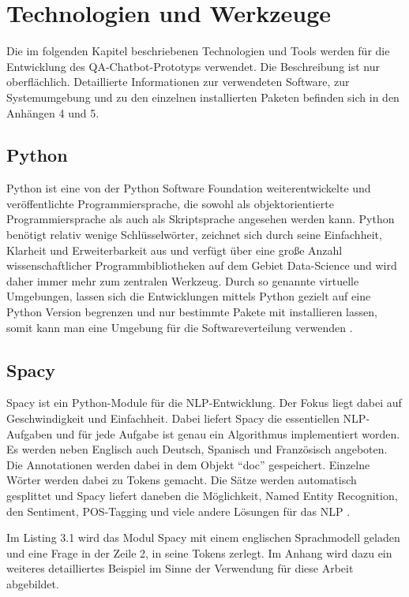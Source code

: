\documentclass[
        ngerman,
        paper=a4,
        numbers=noendperiod,
]{scrreprt}
\begin{document}
\chapter{Technologien und Werkzeuge}

Die im folgenden Kapitel beschriebenen Technologien und Tools werden für die Entwicklung des QA-Chatbot-Prototyps verwendet. Die Beschreibung ist nur oberflächlich. Detaillierte Informationen zur verwendeten Software, zur Systemumgebung und zu den einzelnen installierten Paketen befinden sich in den Anhängen 4 und 5. %
\section{Python}
Python ist eine von der Python Software Foundation weiterentwickelte und veröffentlichte Programmiersprache, die sowohl als objektorientierte Programmiersprache als auch als Skriptsprache angesehen werden kann. Python benötigt relativ wenige Schlüsselwörter, zeichnet sich durch seine Einfachheit, Klarheit und Erweiterbarkeit aus und verfügt über eine große Anzahl wissenschaftlicher Programmbibliotheken auf dem Gebiet Data-Science und wird daher immer mehr zum zentralen Werkzeug. 
Durch so genannte virtuelle Umgebungen, lassen sich die Entwicklungen mittels Python gezielt auf eine Python Version begrenzen und nur bestimmte Pakete mit installieren lassen, somit kann man eine Umgebung für die Softwareverteilung verwenden \citep[S. 2]{GrotzGrundkurs0.1.2d}.
\section{Spacy}
Spacy ist ein Python-Module für die NLP-Entwicklung. Der Fokus liegt dabei auf Geschwindigkeit und Einfachheit. Dabei liefert Spacy die essentiellen NLP-Aufgaben und für jede Aufgabe ist genau ein Algorithmus implementiert worden. Es werden neben Englisch auch Deutsch, Spanisch und Französisch angeboten. Die Annotationen werden dabei in dem Objekt \enquote{doc} gespeichert. Einzelne Wörter werden dabei zu Tokens gemacht. Die Sätze werden automatisch gesplittet und Spacy liefert daneben die Möglichkeit, Named Entity Recognition, den Sentiment, POS-Tagging und viele andere Lösungen für das NLP \citep{SpaCyDocumentation}.

Im Listing 3.1 wird das Modul Spacy mit einem englischen Sprachmodell geladen und eine Frage in der Zeile 2, in seine Tokens zerlegt. Im Anhang wird dazu ein weiteres detailliertes Beispiel im Sinne der Verwendung für diese Arbeit abgebildet.
\end{document}
